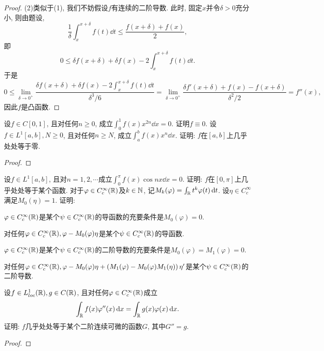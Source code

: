 \begin{quiza}
\begin{proof}
(2)类似于(1), 我们不妨假设\(f\)有连续的二阶导数. 此时, 固定\(x\)并令\(\delta>0\)充分小, 则由题设,\[\frac{1}{\delta}\int_{x}^{x+\delta}f(t)\dd t\leqslant\frac{f(x+\delta)+f(x)}{2},\]即\[0\leqslant\delta f(x+\delta)+\delta f(x)-2\int_{x}^{x+\delta}f(t)\dd t.\]于是\[0\leqslant\lim_{\delta\rightarrow 0^+}\frac{\delta f(x+\delta)+\delta f(x)-2\int_{x}^{x+\delta}f(t)\dd t}{\delta^3/6}=\lim_{\delta\rightarrow 0^+}\frac{\delta f'(x+\delta)+f(x)-f(x+\delta)}{\delta^2/2}=f''(x),\]因此\(f\)是凸函数.
\end{proof}
\woe 设\(f\in C[0,1]\), 且对任何\(n\geqslant 0\), 成立\(\int_{0}^{1}f(x)x^{2n}\dd x=0\). 证明\(f\equiv 0\).
\woe 设\(f\in L^1[a,b],N\geqslant 0\), 且对任何\(n\geqslant N\), 成立\(\int_{a}^{b}f(x)x^n\dd x\). 证明: \(f\)在\([a,b]\)上几乎处处等于零. 
\begin{proof}

\end{proof}
\woe 设\(f\in L^1[a,b]\), 且对\(n=1,2,\cdots\)成立\(\int_{0}^{\pi}f(x)\cos nx\dd x=0\). 证明: \(f\)在\([0,\pi]\)上几乎处处等于某个函数.
\woe 对于\(\varphi\in C_c^{\infty}(\mathbb{R})\)及\(k\in\mathbb{N}\), 记\(M_k(\varphi)=\int_{\mathbb{R}}t^k\varphi(t)\,\mathrm{d} t\). 设\(\eta\in C_c^{\infty}\)满足\(M_0(\eta)=1\). 证明:\begin{quizs}
\item \(\varphi\in C_c^{\infty}(\mathbb{R})\)是某个\(\psi\in C_c^{\infty}(\mathbb{R})\)的导函数的充要条件是\(M_0(\varphi)=0\).
\item 对任何\(\varphi\in C_c^{\infty}(\mathbb{R}), \varphi-M_0(\varphi)\eta\)是某个\(\psi\in C_c^{\infty}(\mathbb{R})\)的导函数.
\item \(\varphi\in C_c^{\infty}(\mathbb{R})\)是某个\(\psi\in C_c^{\infty}(\mathbb{R})\)的二阶导数的充要条件是\(M_0(\varphi)=M_1(\varphi)=0\).
\item 对任何\(\varphi\in C_c^{\infty}(\mathbb{R}),\varphi-M_0(\varphi)\eta+\left(M_1(\varphi)-M_0(\varphi)M_1(\eta)\right)\eta'\)是某个\(\psi\in C_c^{\infty}(\mathbb{R})\)的二阶导数.
\end{quizs}
\woe 设\(f\in L_{loc}^1(\mathbb{R}),g\in C(\mathbb{R})\), 且对任何\(\varphi\in C_c^{\infty}(\mathbb{R})\)成立\[\int_{\mathbb{R}}f(x)\varphi''(x)\,\mathrm{d} x=\int_{\mathbb{R}}g(x)\varphi(x)\,\mathrm{d} x.\]证明: \(f\)几乎处处等于某个二阶连续可微的函数\(G\), 其中\(G''=g\).
\begin{proof}

\end{proof}
\end{quiza}
